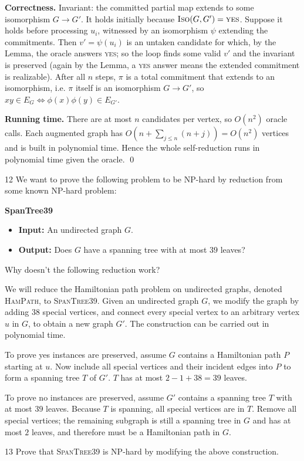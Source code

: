 \documentclass[12pt]{article}
\begin{document}
\begin{solution}
\textbf{Correctness.} Invariant: the committed partial map extends to some isomorphism
$G\to G'$. It holds initially because $\textsc{Iso}(G,G')=\textsc{yes}$. Suppose it holds
before processing $u_i$, witnessed by an isomorphism $\psi$ extending the commitments. Then
$v'=\psi(u_i)$ is an untaken candidate for which, by the Lemma, the oracle answers
\textsc{yes}; so the loop finds some valid $v'$ and the invariant is preserved (again by the
Lemma, a \textsc{yes} answer means the extended commitment is realizable). After all $n$ steps,
$\pi$ is a total commitment that extends to an isomorphism, i.e. $\pi$ itself is an
isomorphism $G\to G'$, so $xy\in E_G\iff\phi(x)\phi(y)\in E_{G'}$.

\textbf{Running time.} There are at most $n$ candidates per vertex, so $O(n^2)$ oracle calls.
Each augmented graph has $O(n+\sum_{j\le n}(n+j))=O(n^2)$ vertices and is built in polynomial
time. Hence the whole self-reduction runs in polynomial time given the oracle. \qed
\end{solution}


\begin{problem}{12}
    We want to prove the following problem to be NP-hard by reduction from some known NP-hard problem:

    \begin{tcolorbox}
         \textbf{SpanTree39}
        \begin{itemize}
            \item \textbf{Input:} An undirected graph $G$.
            \item \textbf{Output:} Does $G$ have a spanning tree with at most $39$ leaves?
        \end{itemize}
    \end{tcolorbox}
   
    Why doesn't the following reduction work?

    \begin{tcolorbox}
        We will reduce the Hamiltonian path problem on undirected graphs, denoted \textsc{HamPath}, to \textsc{SpanTree39}. Given an undirected graph $G$, we modify the graph by adding $38$ special vertices, and connect every special vertex to an arbitrary vertex $u$ in $G$, to obtain a new graph $G'$. The construction can be carried out in polynomial time.

        To prove yes instances are preserved, assume $G$ contains a Hamiltonian path $P$ starting at $u$. Now include all special vertices and their incident edges into $P$ to form a spanning tree $T$ of $G'$. $T$ has at most $2 - 1 + 38 = 39$ leaves.

        To prove no instances are preserved, assume $G'$ contains a spanning tree $T$ with at most $39$ leaves. Because $T$ is spanning, all special vertices are in $T$. Remove all special vertices; the remaining subgraph is still a spanning tree in $G$ and has at most $2$ leaves, and therefore must be a Hamiltonian path in $G$.
    \end{tcolorbox}
\end{problem}

\begin{problem}{13}
    Prove that \textsc{SpanTree39} is NP-hard by modifying the above construction.
\end{problem}
\end{document}
